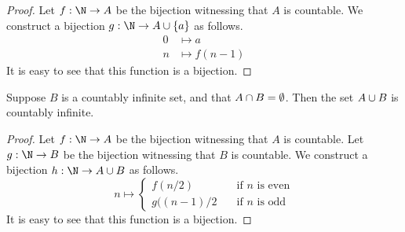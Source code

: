 \documentclass[11pt,letterpaper]{article}
\begin{document}
\begin{proof}
    Let $f : \N \to A$ be the bijection witnessing that $A$ is countable.
    We construct a bijection $g : \N \to A \union \setof{a}$ as follows.
    \begin{align*}
        0 &\mapsto a \\
        n &\mapsto f(n-1)
    \end{align*}
    It is easy to see that this function is a bijection.
\end{proof}

\begin{prop}
    Suppose $B$ is a countably infinite set, and that
    $A \cap B = \emptyset$.
    Then the set $A \cup B$ is countably infinite.
\end{prop}

\begin{proof}
    Let $f : \N \to A$ be the bijection witnessing that $A$ is countable.
    Let $g : \N \to B$ be the bijection witnessing that $B$ is countable.
    We construct a bijection $h : \N \to A \union B$ as follows.
    \begin{equation*}
        n \mapsto \begin{cases}
            f(n/2) &\quad\text{if $n$ is even} \\
            g((n-1)/2 &\quad\text{if $n$ is odd}
        \end{cases}
    \end{equation*}
    It is easy to see that this function is a bijection.
\end{proof}
\end{document}
